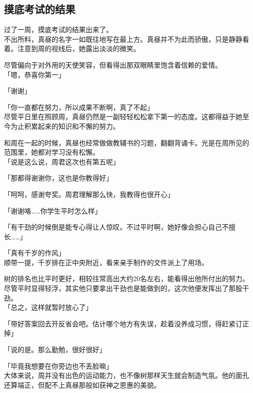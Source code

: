 \subsection{摸底考试的结果}

过了一周，摸底考试的结果出来了。\\

不出所料，真昼的名字一如既往地写在最上方。真昼并不为此而骄傲，只是静静看着。注意到周的视线后，她露出淡淡的微笑。

尽管偏向于对外用的天使笑容，但看得出那双眼睛里饱含着信赖的爱情。\\

「嗯，恭喜你第一」

「谢谢」

「你一直都在努力，所以成果不断啊，真了不起」\\

尽管平日里在照顾周，真昼仍然是一副轻轻松松拿下第一的态度。这都得益于她至今为止积累起来的知识和不懈的努力。

和周在一起的时候，真昼也经常做做教辅书的习题，翻翻背诵卡。光是在周所见的范围里，她都对学习没有松懈。\\

「说是这么说，周君这次也有第五呢」

「那都得谢谢你，这也是你教得好」

「呵呵，感谢夸奖。周君理解那么快，我教得也很开心」

「谢谢咯……你学生平时怎么样」

「有干劲的时候倒是能专心得让人惊叹。不过平时啊，她好像会担心自己不擅长……」

「真有千岁的作风」\\

顺带一提，千岁排在正中央附近，看来亲手制作的文件派上了用场。

树的排名也比平时更好，相较往常高出大约20名左右，能看得出他所付出的努力。尽管平时显得轻浮，其实他只要拿出干劲也是能做到的，这次他便发挥出了那股干劲。\\

「总之，这样就暂时放心了」

「带好答案回去开反省会吧。估计哪个地方有失误，趁着没养成习惯，得赶紧订正掉」

「说的是。那么勤勉，很好很好」

「毕竟我想要在你旁边也不丢脸嘛」\\

大体来说，周并没有出色的运动能力，也不像树那样天生就会制造气氛。他的面孔还算端正，但配不上真昼那般如获神之恩惠的美貌。\\

